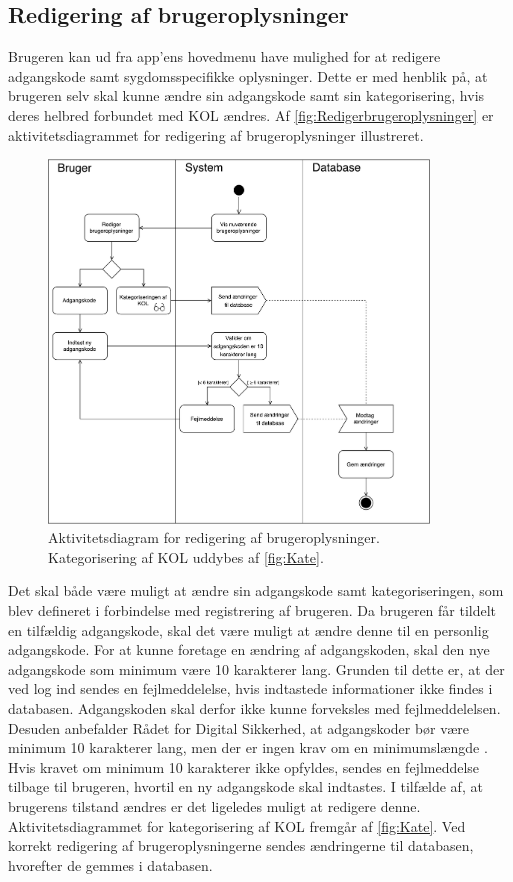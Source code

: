 \subsection*{Redigering af brugeroplysninger} \label{sec:redigrering}
Brugeren kan ud fra app'ens hovedmenu have mulighed for at redigere adgangskode samt sygdomsspecifikke oplysninger. Dette er med henblik på, at brugeren selv skal kunne ændre sin adgangskode samt sin kategorisering, hvis deres helbred forbundet med KOL ændres. Af \autoref{fig:Redigerbrugeroplysninger} er aktivitetsdiagrammet for redigering af brugeroplysninger illustreret. 

\begin{figure} [H]
\centering
\includegraphics[width=0.9\textwidth]{figures/aktivitetsdiagram/Redigerbrugeroplysninger}
\caption{Aktivitetsdiagram for redigering af brugeroplysninger. Kategorisering af KOL uddybes af \autoref{fig:Kate}.}
\label{fig:Redigerbrugeroplysninger}
\end{figure}

\noindent
Det skal både være muligt at ændre sin adgangskode samt kategoriseringen, som blev defineret i forbindelse med registrering af brugeren. Da brugeren får tildelt en tilfældig adgangskode, skal det være muligt at ændre denne til en personlig adgangskode. For at kunne foretage en ændring af adgangskoden, skal den nye adgangskode som minimum være 10 karakterer lang. Grunden til dette er, at der ved log ind sendes en fejlmeddelelse, hvis indtastede informationer ikke findes i databasen. Adgangskoden skal derfor ikke kunne forveksles med fejlmeddelelsen. Desuden anbefalder Rådet for Digital Sikkerhed, at adgangskoder bør være minimum 10 karakterer lang, men der er ingen krav om en minimumslængde \citep{sikkerhed2015}.
Hvis kravet om minimum 10 karakterer ikke opfyldes, sendes en fejlmeddelse tilbage til brugeren, hvortil en ny adgangskode skal indtastes. 
I tilfælde af, at brugerens tilstand ændres er det ligeledes muligt at redigere denne. Aktivitetsdiagrammet for kategorisering af KOL fremgår af \autoref{fig:Kate}.
Ved korrekt redigering af brugeroplysningerne sendes ændringerne til databasen, hvorefter de gemmes i databasen.